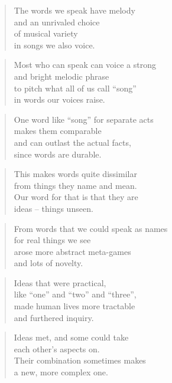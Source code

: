 \documentclass[14pt,a4paper]{article}
\begin{document}
\begin{verse}
The words we speak have melody\\
and an unrivaled choice\\
of musical variety\\
in songs we also voice.
\end{verse}

\begin{verse}
Most who can speak can voice a strong\\
and bright melodic phrase\\
to pitch what all of us call “song”\\
in words our voices raise.
\end{verse}

\begin{verse}
One word like “song” for separate acts\\
makes them comparable\\
and can outlast the actual facts,\\
since words are durable.
\end{verse}

\begin{verse}
This makes words quite dissimilar\\
from things they name and mean.\\
Our word for that is that they are\\
ideas – things unseen.
\end{verse}

\begin{verse}
From words that we could speak as names\\
for real things we see\\
arose more abstract meta-games\\
and lots of novelty.
\end{verse}

\begin{verse}
Ideas that were practical,\\
like “one” and “two” and “three”,\\
made human lives more tractable\\
and furthered inquiry.
\end{verse}

\begin{verse}
Ideas met, and some could take\\
each other’s aspects on.\\
Their combination sometimes makes\\
a new, more complex one.
\end{verse}
\end{document}
